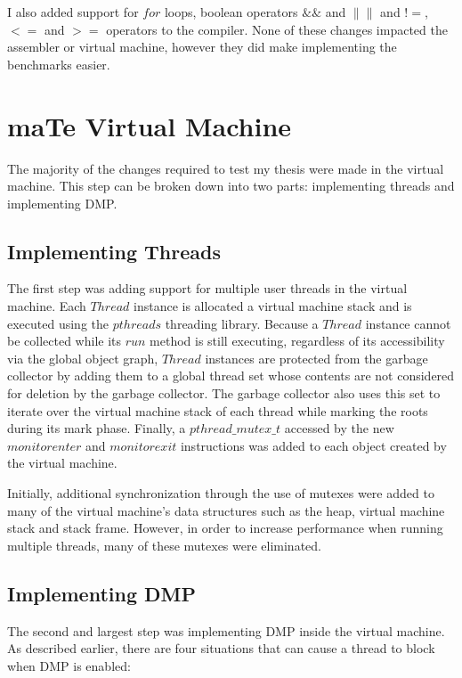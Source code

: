 I also added support for $for$ loops, boolean operators $\&\&$ and
$\|\|$ and $!=$, $<=$ and $>=$ operators to the compiler.  None of
these changes impacted the assembler or virtual machine, however they
did make implementing the benchmarks easier.

\section{maTe Virtual Machine}

The majority of the changes required to test my thesis were made in
the virtual machine.  This step can be broken down into two parts:
implementing threads and implementing DMP.

\subsection{Implementing Threads}

The first step was adding support for multiple user threads in the
virtual machine.  Each $Thread$ instance is allocated a virtual
machine stack and is executed using the $pthreads$ threading library.
Because a $Thread$ instance cannot be collected while its $run$ method
is still executing, regardless of its accessibility via the global
object graph, $Thread$ instances are protected from the garbage
collector by adding them to a global thread set whose contents are not
considered for deletion by the garbage collector.  The garbage
collector also uses this set to iterate over the virtual machine stack
of each thread while marking the roots during its mark phase.
Finally, a $pthread\_mutex\_t$ accessed by the new $monitorenter$ and
$monitorexit$ instructions was added to each object created by the
virtual machine.

Initially, additional synchronization through the use of mutexes were
added to many of the virtual machine's data structures such as the
heap, virtual machine stack and stack frame.  However, in order to
increase performance when running multiple threads, many of these
mutexes were eliminated.

\subsection{Implementing DMP}

The second and largest step was implementing DMP inside the virtual
machine.  As described earlier, there are four situations that can
cause a thread to block when DMP is enabled:

